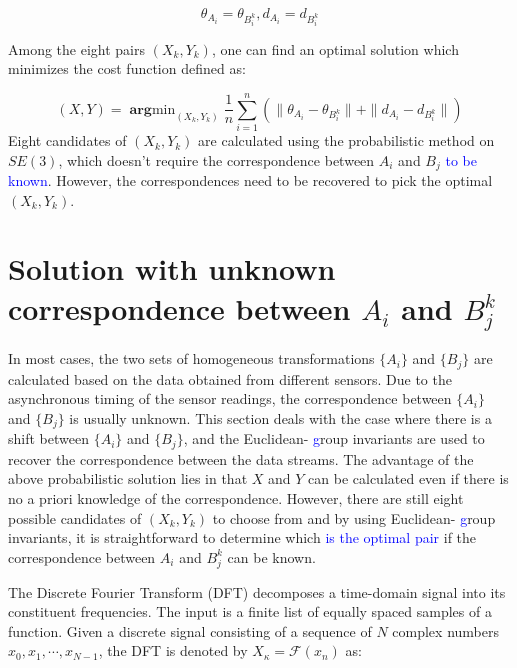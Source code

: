\documentclass[letterpaper, 10 pt, conference]{ieeeconf}  %
\begin{document}
\begin{equation}\label{equ22}
    \theta_{A_{i}}=\theta_{B_{i}^{k}}, d_{A_{i}}=d_{B_{i}^{k}}
\end{equation}

Among the eight pairs $(X_{k},Y_{k})$, one can find an optimal solution which  minimizes the cost function defined as:

\begin{equation}\label{equ23}
    (X,Y) = \mathop{\mathbf{arg}min}_{(X_{k},Y_{k})}\frac{1}{n} \sum_{i=1}^{n} (\parallel \theta_{A_{i}}-\theta_{B_{i}^{k}} \parallel + \parallel d_{A_{i}}-d_{B_{i}^{k}} \parallel)
\end{equation}
Eight candidates of $(X_k, Y_k)$ are calculated using the probabilistic method on $SE(3)$, which doesn't require the correspondence between $A_{i}$ and $B_{j}$ \textcolor{blue}{to be known}. However,
the correspondences need %
 to be recovered to pick the optimal $(X_k, Y_k)$.
\section{Solution with unknown correspondence between $A_{i}$ and $B_{j}^{k}$}
\label{sect3}

In most cases, the two sets of homogeneous transformations  $\{A_i\}$ and $\{B_j\}$ are calculated based on the data obtained from different sensors. Due to the asynchronous timing of the sensor readings, the correspondence between $\{A_{i}\}$ and $\{B_{j}\}$ is usually unknown. This section deals with the case where there is a shift between $\{A_i\}$ and $\{B_j\}$, and the Euclidean-%
\textcolor{blue}{g}roup invariants are used to recover the correspondence between the data streams. The advantage of the above probabilistic solution lies in that $X$ and $Y$ can be calculated even if there is no %
a priori knowledge of the correspondence. However, there are still eight possible candidates of $(X_{k},Y_{k})$ to choose from and by using Euclidean-%
\textcolor{blue}{g}roup invariants, it is straightforward to determine which \textcolor{blue}{is the optimal pair} %
if the correspondence between $A_{i}$ and $B_{j}^{k}$ can be known.

The Discrete Fourier Transform (DFT) decomposes a time-domain signal into its constituent frequencies. The input is a finite list of equally spaced samples of a function. Given a discrete signal consisting of a sequence of $N$ complex numbers $x_{0},x_{1},\cdots,x_{N-1}$, the DFT is denoted by $X_{\kappa} = \mathcal{F}({x_{n}})$ as:
\end{document}
